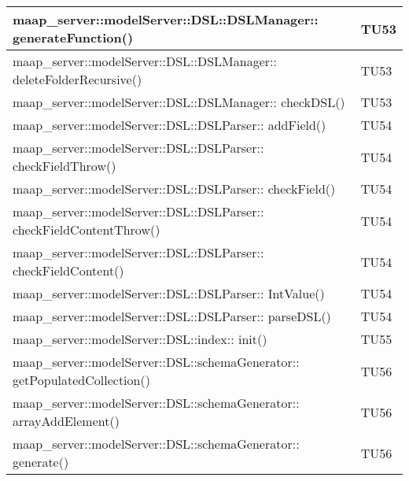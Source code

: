 \begin{center}
\begin{longtable}{|p{12cm}|p{2cm}|}
\midrule
maap\_server::modelServer::DSL::DSLManager:: generateFunction() & TU53\\

\midrule
maap\_server::modelServer::DSL::DSLManager:: deleteFolderRecursive() & TU53\\

\midrule
maap\_server::modelServer::DSL::DSLManager:: checkDSL() & TU53\\

\midrule
maap\_server::modelServer::DSL::DSLParser:: addField() & TU54\\

\midrule
maap\_server::modelServer::DSL::DSLParser:: checkFieldThrow() & TU54\\

\midrule
maap\_server::modelServer::DSL::DSLParser:: checkField() & TU54\\

\midrule
maap\_server::modelServer::DSL::DSLParser:: checkFieldContentThrow() & TU54\\

\midrule
maap\_server::modelServer::DSL::DSLParser:: checkFieldContent() & TU54\\

\midrule
maap\_server::modelServer::DSL::DSLParser:: IntValue() & TU54\\

\midrule
maap\_server::modelServer::DSL::DSLParser:: parseDSL() & TU54\\

\midrule
maap\_server::modelServer::DSL::index:: init() & TU55\\

\midrule
maap\_server::modelServer::DSL::schemaGenerator:: getPopulatedCollection() & TU56\\

\midrule
maap\_server::modelServer::DSL::schemaGenerator:: arrayAddElement() & TU56\\

\midrule
maap\_server::modelServer::DSL::schemaGenerator:: generate() & TU56\\


\end{longtable}
\end{center}

